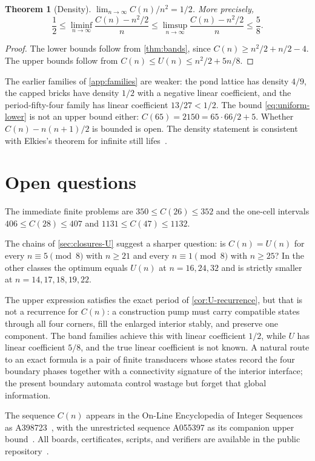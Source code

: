 \documentclass[10pt]{article}
\newtheorem{theorem}{Theorem}[section]
\theoremstyle{remark}
\begin{document}
\begin{theorem}[Density]\label{thm:density}
$\lim_{n\to\infty}C(n)/n^2=1/2$.  More precisely,
\[
 \frac12\le\liminf_{n\to\infty}\frac{C(n)-n^2/2}n\le
 \limsup_{n\to\infty}\frac{C(n)-n^2/2}n\le\frac58.
\]
\end{theorem}

\begin{proof}
The lower bounds follow from \cref{thm:bands}, since $C(n)\ge n^2/2+n/2-4$.  The
upper bounds follow from $C(n)\le U(n)\le n^2/2+5n/8$.
\end{proof}

The earlier families of \cref{app:families} are weaker: the pond lattice has
density $4/9$, the capped bricks have density $1/2$ with a negative linear
coefficient, and the period-fifty-four family has linear coefficient $13/27<1/2$.
The bound \eqref{eq:uniform-lower} is not an upper bound either:
$C(65)=2150=65\cdot66/2+5$.  Whether $C(n)-n(n+1)/2$ is bounded is open.  The
density statement is consistent with Elkies's theorem for infinite still
lifes~\cite{elkies-1999}.

\section{Open questions}\label{sec:open}

The immediate finite problems are $350\le C(26)\le352$ and the one-cell
intervals $406\le C(28)\le407$ and $1131\le C(47)\le1132$.

The chains of \cref{sec:closures-U} suggest a sharper question: is
$C(n)=U(n)$ for every $n\equiv5\pmod8$ with $n\ge21$ and every $n\equiv1\pmod8$
with $n\ge25$?  In the other classes the optimum equals $U(n)$ at $n=16,24,32$
and is strictly smaller at $n=14,17,18,19,22$.

The upper expression satisfies the exact period of \cref{cor:U-recurrence}, but
that is not a recurrence for $C(n)$: a construction pump must carry compatible
states through all four corners, fill the enlarged interior stably, and preserve
one component.  The band families achieve this with linear coefficient $1/2$,
while $U$ has linear coefficient $5/8$, and the true linear coefficient is not
known.  A natural route to an exact formula is a pair of finite transducers whose
states record the four boundary phases together with a connectivity signature of
the interior interface; the present boundary automata control wastage but forget
that global information.

The sequence $C(n)$ appears in the On-Line Encyclopedia of Integer Sequences as
A398723~\cite{oeis-a398723}, with the unrestricted sequence A055397 as its
companion upper bound~\cite{oeis-a055397}.  All boards, certificates, scripts,
and verifiers are available in the public repository~\cite{repo}.
\end{document}
